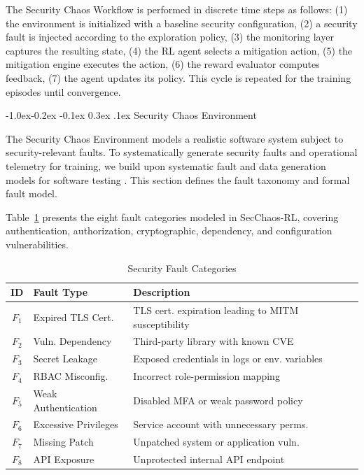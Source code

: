 \documentclass[conference,10pt]{IEEEtran}
\makeatletter
\renewcommand\subsection{\@startsection{subsection}{2}{\z@}%
	{-1.0ex\@plus -0.2ex \@minus -0.1ex}%
	{0.3ex \@plus .1ex}%
	{\normalfont\normalsize\itshape}}
\makeatother
\begin{document}
The Security Chaos Workflow is performed in discrete time steps as follows: (1) the environment is initialized with a baseline security configuration, (2) a security fault is injected according to the exploration policy, (3) the monitoring layer captures the resulting state, (4) the RL agent selects a mitigation action, (5) the mitigation engine executes the action, (6) the reward evaluator computes feedback, (7) the agent updates its policy. This cycle is repeated for the training episodes until convergence. 

\subsection{Security Chaos Environment}

The Security Chaos Environment models a realistic software system subject to security-relevant faults. To systematically generate security faults and operational telemetry for training, we build upon systematic fault and data generation models for software testing \cite{baghorn2022fault}. This section defines the fault taxonomy and formal fault model.

Table~\ref{tab:fault_categories} presents the eight fault categories modeled in SecChaos-RL, covering authentication, authorization, cryptographic, dependency, and configuration vulnerabilities.

\begin{table}[!t]
	\centering
	\caption{Security Fault Categories}
	\label{tab:fault_categories}
	\footnotesize
	\begin{tabular}{@{}clp{3.2cm}@{}}
		\toprule
		\textbf{ID} & \textbf{Fault Type} & \textbf{Description} \\
		\midrule
		$F_1$ & Expired TLS Cert. & TLS cert. expiration leading to MITM susceptibility \\
		$F_2$ & Vuln. Dependency & Third-party library with known CVE \\
		$F_3$ & Secret Leakage & Exposed credentials in logs or env. variables \\
		$F_4$ & RBAC Misconfig. & Incorrect role-permission mapping \\
		$F_5$ & Weak Authentication & Disabled MFA or weak password policy \\
		$F_6$ & Excessive Privileges & Service account with unnecessary perms. \\
		$F_7$ & Missing Patch & Unpatched system or application vuln. \\
		$F_8$ & API Exposure & Unprotected internal API endpoint \\
		\bottomrule
	\end{tabular}
\end{table}
\end{document}
